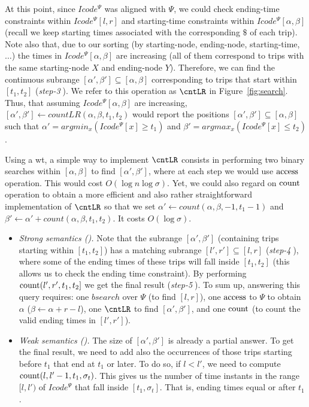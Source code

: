 \begin{itemize}[leftmargin=3mm]
		At this point, since $Icode^{\Psi}$  was aligned with $\Psi$, 
		we could check ending-time constraints within $Icode^{\Psi}[l,r]$  and starting-time constraints 
		within $Icode^{\Psi}[\alpha,\beta]$ (recall we keep starting times associated with the corresponding $\$$ of each trip).
		Note also that, due to our sorting (by starting-node, ending-node, starting-time,$\dots$) the times in $Icode^{\Psi}[\alpha,\beta]$ are 
		increasing (all of them correspond to trips with the same starting-node $X$ and ending-node $Y$). Therefore,
		we can find the continuous subrange $[\alpha',\beta'] \subseteq [\alpha,\beta] $ corresponding to trips
		that start within $[t_1, t_2]$ ({\em step-\textcircled{3}}). We refer to this operation as $\cntLR$ in Figure~\ref{fig:search}.
		Thus, that assuming $Icode^{\Psi}[\alpha,\beta]$ are increasing,  
		$[\alpha',\beta'] \leftarrow countLR(\alpha,\beta,t_1,t_2)$ would report the 
		positions $[\alpha',\beta'] \subseteq [\alpha,\beta]$ such that $\alpha' = argmin_{x} (Icode^{\Psi}[x] \geq t_1)$ and
		$\beta' = argmax_{x} (Icode^{\Psi}[x] \leq t_2)$.
		
		Using a \gls{wt}, a simple way to implement $\cntLR$  consists in performing  two binary searches within 
		$[\alpha,\beta]$ to find $[\alpha',\beta']$, where at each step we would use $\operatorname{access}$ operation. This would cost $O(\log n \log \sigma)$. 
		Yet, we could also regard on $\operatorname{count}$ operation to obtain a more efficient and also rather straightforward 
		implementation of $\cntLR$ so that we set $\alpha' \leftarrow count(\alpha,\beta,-1,t_1-1)$ and
		$\beta' \leftarrow \alpha'+ count(\alpha,\beta,t_1,t_2)$. It costs $O(\log\sigma)$.
		
		
		\begin{itemize}
			\item {\em Strong semantics (\Tfxtys).} Note that the subrange $[\alpha',\beta']$ (containing trips starting within $[t_1,t_2]$) 
			has a matching subrange $[l',r'] \subseteq [l,r]$ ({\em step-\textcircled{4}}), where some of the ending times of these trips will fall inside 
			$[t_1, t_2]$ (this allows us to check the ending time constraint). By performing  $\operatorname{count}(l',r',t_1,t_2]$  we get the final result 
			({\em step-\textcircled{5}}). 
			To sum up, answering this query  requires: one $bsearch$ over $\Psi$ (to find $[l,r]$), one $\operatorname{access}$ to $\Psi$ to obtain
			 $\alpha$ ($\beta\leftarrow \alpha+r-l$), one $\cntLR$ to find $[\alpha',\beta']$, and one $\operatorname{count}$ 
			 (to count the valid ending times in $[l',r']$).
			
			
			\item {\em Weak semantics (\Tfxtyw).}
			The size of $[\alpha',\beta']$ is already a partial answer. To get the final result, we need to add 
			also the occurrences of those trips starting before $t_1$ that end at $t_1$ or later. 
			To do so, if $l<l'$, we need to compute $\operatorname{count}(l,l'-1, t_1, {\sigma_t})$. This gives us the number of time 
			instants in the range $[l,l')$ of  $Icode^{\Psi}$ that fall inside $[t_1, {\sigma_t}]$. 
			That is, ending times equal or after $t_1$.
		\end{itemize}
		

\end{itemize}
